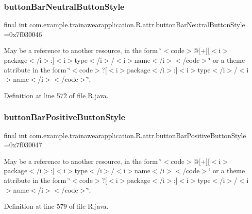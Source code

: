 \subsubsection{\texorpdfstring{buttonBarNeutralButtonStyle}{buttonBarNeutralButtonStyle}}
{\footnotesize\ttfamily final int com.\+example.\+trainawearapplication.\+R.\+attr.\+button\+Bar\+Neutral\+Button\+Style =0x7f030046\hspace{0.3cm}{\ttfamily [static]}}

May be a reference to another resource, in the form \char`\"{}$<$code$>$@\mbox{[}+\mbox{]}\mbox{[}$<$i$>$package$<$/i$>$\+:\mbox{]}$<$i$>$type$<$/i$>$/$<$i$>$name$<$/i$>$$<$/code$>$\char`\"{} or a theme attribute in the form \char`\"{}$<$code$>$?\mbox{[}$<$i$>$package$<$/i$>$\+:\mbox{]}$<$i$>$type$<$/i$>$/$<$i$>$name$<$/i$>$$<$/code$>$\char`\"{}. 

Definition at line 572 of file R.\+java.

\mbox{\label{classcom_1_1example_1_1trainawearapplication_1_1_r_1_1attr_ad5b6084056b62e9c4ea88beeddea067a}} 
\subsubsection{\texorpdfstring{buttonBarPositiveButtonStyle}{buttonBarPositiveButtonStyle}}
{\footnotesize\ttfamily final int com.\+example.\+trainawearapplication.\+R.\+attr.\+button\+Bar\+Positive\+Button\+Style =0x7f030047\hspace{0.3cm}{\ttfamily [static]}}

May be a reference to another resource, in the form \char`\"{}$<$code$>$@\mbox{[}+\mbox{]}\mbox{[}$<$i$>$package$<$/i$>$\+:\mbox{]}$<$i$>$type$<$/i$>$/$<$i$>$name$<$/i$>$$<$/code$>$\char`\"{} or a theme attribute in the form \char`\"{}$<$code$>$?\mbox{[}$<$i$>$package$<$/i$>$\+:\mbox{]}$<$i$>$type$<$/i$>$/$<$i$>$name$<$/i$>$$<$/code$>$\char`\"{}. 

Definition at line 579 of file R.\+java.

\mbox{\label{classcom_1_1example_1_1trainawearapplication_1_1_r_1_1attr_a0893ff687340524469bf81e524cd32ed}} 
